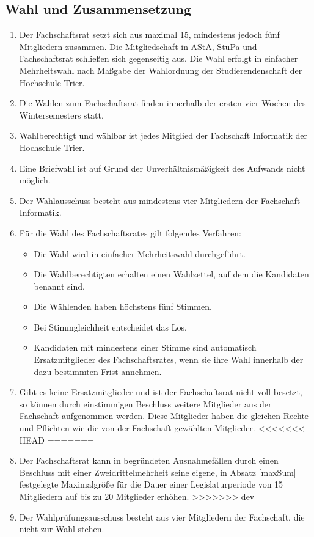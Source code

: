 \subsection{Wahl und Zusammensetzung}
\label{sec:zusammensetzung}
\begin{enumerate}
\item Der Fachschaftsrat setzt sich aus maximal 15, mindestens jedoch fünf Mitgliedern zusammen. Die Mitgliedschaft in AStA, StuPa und Fachschaftsrat schließen sich gegenseitig aus. Die Wahl erfolgt in einfacher Mehrheitswahl nach Maßgabe der Wahlordnung der Studierendenschaft der Hochschule Trier.
\item Die Wahlen zum Fachschaftsrat finden innerhalb der ersten vier Wochen des Wintersemesters statt.
\item Wahlberechtigt und wählbar ist jedes Mitglied der Fachschaft Informatik der Hochschule Trier.
\item Eine Briefwahl ist auf Grund der Unverhältnismäßigkeit des Aufwands nicht möglich.
\item Der Wahlausschuss besteht aus mindestens vier Mitgliedern der Fachschaft Informatik.
\item Für die Wahl des Fachschaftsrates gilt folgendes Verfahren:
\begin{itemize}
\item Die Wahl wird in einfacher Mehrheitswahl durchgeführt.
\item Die Wahlberechtigten erhalten einen Wahlzettel, auf dem die Kandidaten benannt sind.
\item Die Wählenden haben höchstens fünf Stimmen.
\item Bei Stimmgleichheit entscheidet das Los.
\item Kandidaten mit mindestens einer Stimme sind automatisch Ersatzmitglieder des Fachschaftsrates, wenn sie ihre Wahl innerhalb der dazu bestimmten Frist annehmen.
\end{itemize}
\item \label{ersatz} Gibt es keine Ersatzmitglieder und ist der Fachschaftsrat nicht voll besetzt, so können durch einstimmigen Beschluss weitere Mitglieder aus der Fachschaft aufgenommen werden. Diese Mitglieder haben die gleichen Rechte und Pflichten wie die von der Fachschaft gewählten Mitglieder.
<<<<<<< HEAD
=======
\item Der Fachschaftsrat kann in begründeten Ausnahmefällen durch einen Beschluss mit einer Zweidrittelmehrheit seine eigene, in Absatz \ref{maxSum} festgelegte Maximalgröße für die Dauer einer Legislaturperiode von 15 Mitgliedern auf bis zu 20 Mitglieder erhöhen.
>>>>>>> dev
\item Der Wahlprüfungsausschuss besteht aus vier Mitgliedern der Fachschaft, die nicht zur Wahl stehen.
\end{enumerate}

